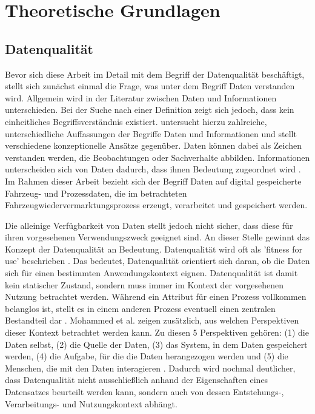 \documentclass[../main.tex]{subfiles}
\begin{document}
\chapter{Theoretische Grundlagen}
\label{chap:TheoGrundlagen}

\section{Datenqualität}

Bevor sich diese Arbeit im Detail mit dem Begriff der Datenqualität beschäftigt, stellt sich zunächst einmal die Frage, was unter dem Begriff Daten verstanden wird. Allgemein wird in der Literatur zwischen Daten und Informationen unterschieden. Bei der Suche nach einer Definition zeigt sich jedoch, dass kein einheitliches Begriffsverständnis existiert. \textcite{zinsConceptualApproachesDefining2007} untersucht hierzu zahlreiche, unterschiedliche Auffassungen der Begriffe Daten und Informationen und stellt verschiedene konzeptionelle Ansätze gegenüber. Daten können dabei als Zeichen verstanden werden, die Beobachtungen oder Sachverhalte abbilden. Informationen unterscheiden sich von Daten dadurch, dass ihnen Bedeutung zugeordnet wird \parencite{zinsConceptualApproachesDefining2007}. Im Rahmen dieser Arbeit bezieht sich der Begriff Daten auf digital gespeicherte Fahrzeug- und Prozessdaten, die im betrachteten Fahrzeugwiedervermarktungsprozess erzeugt, verarbeitet und gespeichert werden. 

Die alleinige Verfügbarkeit von Daten stellt jedoch nicht sicher, dass diese für ihren vorgesehenen Verwendungszweck geeignet sind. An dieser Stelle gewinnt das Konzept der Datenqualität an Bedeutung. Datenqualität wird oft als 'fitness for use' beschrieben \parencite{wangAccuracyWhatData1996,wattsDataQualityAssessment2009,tayiExaminingDataQuality1998}. Das bedeutet, Datenqualität orientiert sich daran, ob die Daten sich für einen bestimmten Anwendungskontext eignen. Datenqualität ist damit kein statischer Zustand, sondern muss immer im Kontext der vorgesehenen Nutzung betrachtet werden. Während ein Attribut für einen Prozess vollkommen belanglos ist, stellt es in einem anderen Prozess eventuell einen zentralen Bestandteil dar \parencite{wattsDataQualityAssessment2009}. Mohammed et al. zeigen zusätzlich, aus welchen Perspektiven dieser Kontext betrachtet werden kann. Zu diesen 5 Perspektiven gehören: (1) die Daten selbst, (2) die Quelle der Daten, (3) das System, in dem Daten gespeichert werden, (4) die Aufgabe, für die die Daten herangezogen werden und (5) die Menschen, die mit den Daten interagieren \parencite{mohammedFiveFacetsData2024}. Dadurch wird nochmal deutlicher, dass Datenqualität nicht ausschließlich anhand der Eigenschaften eines Datensatzes beurteilt werden kann, sondern auch von dessen Entstehungs-, Verarbeitungs- und Nutzungskontext abhängt.
\end{document}
